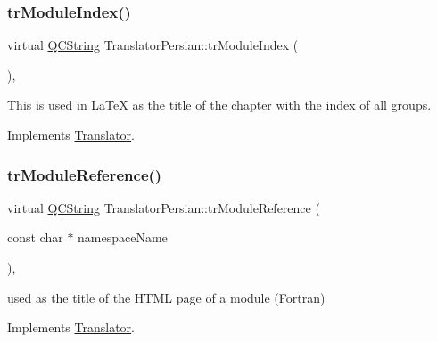 \mbox{\label{class_translator_persian_ad4032490e3dd2b17ce5cff38aed220d3}} 
\subsubsection{\texorpdfstring{trModuleIndex()}{trModuleIndex()}}
{\footnotesize\ttfamily virtual \mbox{\hyperlink{class_q_c_string}{Q\+C\+String}} Translator\+Persian\+::tr\+Module\+Index (\begin{DoxyParamCaption}{ }\end{DoxyParamCaption})\hspace{0.3cm}{\ttfamily [inline]}, {\ttfamily [virtual]}}

This is used in La\+TeX as the title of the chapter with the index of all groups. 

Implements \mbox{\hyperlink{class_translator}{Translator}}.

\mbox{\label{class_translator_persian_ae74202e285172d8f1c8cabadc07a338a}} 
\subsubsection{\texorpdfstring{trModuleReference()}{trModuleReference()}}
{\footnotesize\ttfamily virtual \mbox{\hyperlink{class_q_c_string}{Q\+C\+String}} Translator\+Persian\+::tr\+Module\+Reference (\begin{DoxyParamCaption}\item[{const char $\ast$}]{namespace\+Name }\end{DoxyParamCaption})\hspace{0.3cm}{\ttfamily [inline]}, {\ttfamily [virtual]}}

used as the title of the H\+T\+ML page of a module (Fortran) 

Implements \mbox{\hyperlink{class_translator}{Translator}}.

\mbox{\label{class_translator_persian_af3012bb59a2f8fe6600ebc8fde9bf9f9}} 
